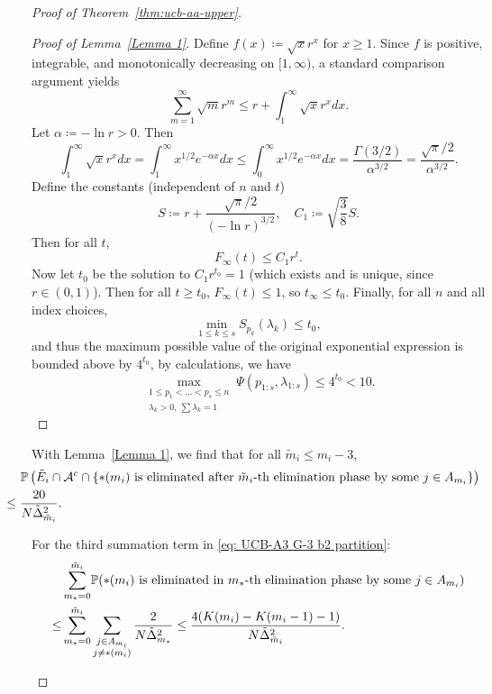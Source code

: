 \documentclass[11pt]{article}
\begin{document}
\begin{proof}[Proof of Theorem~\ref{thm:ucb-aa-upper}]
\begin{itemize}
\begin{itemize}
\begin{proof}[Proof of Lemma~\ref{Lemma 1}]
Define \( f(x) \coloneqq \sqrt{x} r^x \) for \( x \geq 1 \). Since \( f \) is positive, integrable, and monotonically decreasing on \( [1, \infty) \), a standard comparison argument yields
\[
\sum_{m=1}^\infty \sqrt{m} r^m \leq r + \int_1^\infty \sqrt{x} r^x dx.
\]
Let \( \alpha \coloneqq -\ln r > 0 \). Then
\[
\int_1^\infty \sqrt{x} r^x dx = \int_1^\infty x^{1/2} e^{-\alpha x} dx \leq \int_0^\infty x^{1/2} e^{-\alpha x} dx = \frac{\Gamma(3/2)}{\alpha^{3/2}} = \frac{\sqrt{\pi}/2}{\alpha^{3/2}}.
\]
Define the constants (independent of \( n \) and \( t \))
\[
S \coloneqq r + \frac{\sqrt{\pi}/2}{(-\ln r)^{3/2}}, \quad C_1 \coloneqq \sqrt{\frac{3}{8}} S.
\]
Then for all \( t \),
\[
F_\infty(t) \leq C_1 r^t.
\]
Now let \( t_0 \) be the solution to \( C_1 r^{t_0} = 1 \) (which exists and is unique, since \( r \in (0,1) \)). Then for all \( t \geq t_0 \), \( F_\infty(t) \leq 1 \), so \( t_\infty \leq t_0 \). Finally, for all \( n \) and all index choices,
\[
\min_{1 \leq k \leq s} S_{p_k}(\lambda_k) \leq t_0,
\]
and thus the maximum possible value of the original exponential expression is bounded above by \( 4^{t_0} \), by calculations, we have
\[
\max_{\substack{1 \leq p_1 < \dots < p_s \leq n \\ \lambda_k > 0,\ \sum \lambda_k = 1}} \Psi(p_{1:s}, \lambda_{1:s}) \leq 4^{t_0}<10.
\]\end{proof}
With Lemma~\ref{Lemma 1}, we find that for all $\tilde{m}_i\leq m_i-3$, 
\begin{align}
&\!\!\!\!\!\!\!\!\!\!\!\!\!\!\!\!\;\;\;\;\;\mathbb{P}\left(\tilde{E}_i\cap\mathcal{A}^c\cap\left\{\text{$*(m_i)$ is eliminated after $\tilde{m}_i$-th elimination phase } \text{by some }j\in A_{m_i}\right\}\right)\notag\\
   & \!\!\!\!\!\!\!\!\!\!\!\!\!\!\!\!\leq \frac{20}{N\tilde{\Delta}_{\tilde{m}_i}^2}.
    \label{eq: UCB-A3 G-3 b2 partition term 2}
\end{align}
\end{itemize}
 For the third summation term in \eqref{eq: UCB-A3 G-3 b2 partition}:
\begin{align}
    &\sum_{m_*=0}^{\tilde{m}_i} \!\mathbb{P}\!\left(\text{$*(m_i)$ is eliminated in $m_*$-th elimination phase } \text{by some }j\in A_{m_i}\right)\notag\\
    \leq &\sum_{m_*=0}^{\tilde{m}_i}\sum_{\substack{j \in A_{m_i}\\j\neq *(m_i)}}\frac{2}{N\tilde{\Delta}_{m_*}^2}\leq \frac{4(K(m_i)-K(m_i-1)-1)}{N\tilde{\Delta}_{\tilde{m}_i}^2}.
    \label{eq: UCB-A3 G-3 b2 partition term 3}

\end{align}
\end{itemize}
\end{proof}
\end{document}
